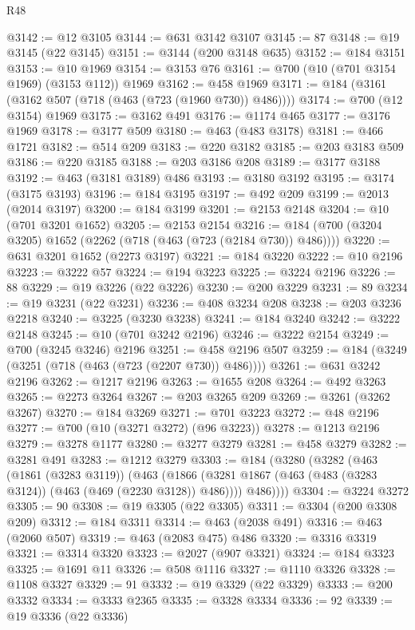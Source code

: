 \begin{lexlean}{R48}
\begin{coremodule}
@3142 := @12 @3105
@3144 := @631 @3142 @3107
@3145 := 87
@3148 := @19 @3145 (@22 @3145)
@3151 := @3144 (@200 @3148 @635)
@3152 := @184 @3151
@3153 := @10 @1969
@3154 := @3153 @76
@3161 := @700 (@10 (@701 @3154 @1969) (@3153 @112)) @1969
@3162 := @458 @1969
@3171 := @184 (@3161 (@3162 @507 (@718 (@463 (@723 (@1960 @730)) @486))))
@3174 := @700 (@12 @3154) @1969
@3175 := @3162 @491
@3176 := @1174 @465
@3177 := @3176 @1969
@3178 := @3177 @509
@3180 := @463 (@483 @3178)
@3181 := @466 @1721
@3182 := @514 @209
@3183 := @220 @3182
@3185 := @203 @3183 @509
@3186 := @220 @3185
@3188 := @203 @3186 @208
@3189 := @3177 @3188
@3192 := @463 (@3181 @3189) @486
@3193 := @3180 @3192
@3195 := @3174 (@3175 @3193)
@3196 := @184 @3195
@3197 := @492 @209
@3199 := @2013 (@2014 @3197)
@3200 := @184 @3199
@3201 := @2153 @2148
@3204 := @10 (@701 @3201 @1652)
@3205 := @2153 @2154
@3216 := @184 (@700 (@3204 @3205) @1652 (@2262 (@718 (@463 (@723 (@2184 @730)) @486))))
@3220 := @631 @3201 @1652 (@2273 @3197)
@3221 := @184 @3220
@3222 := @10 @2196
@3223 := @3222 @57
@3224 := @194 @3223
@3225 := @3224 @2196
@3226 := 88
@3229 := @19 @3226 (@22 @3226)
@3230 := @200 @3229
@3231 := 89
@3234 := @19 @3231 (@22 @3231)
@3236 := @408 @3234 @208
@3238 := @203 @3236 @2218
@3240 := @3225 (@3230 @3238)
@3241 := @184 @3240
@3242 := @3222 @2148
@3245 := @10 (@701 @3242 @2196)
@3246 := @3222 @2154
@3249 := @700 (@3245 @3246) @2196
@3251 := @458 @2196 @507
@3259 := @184 (@3249 (@3251 (@718 (@463 (@723 (@2207 @730)) @486))))
@3261 := @631 @3242 @2196
@3262 := @1217 @2196
@3263 := @1655 @208
@3264 := @492 @3263
@3265 := @2273 @3264
@3267 := @203 @3265 @209
@3269 := @3261 (@3262 @3267)
@3270 := @184 @3269
@3271 := @701 @3223
@3272 := @48 @2196
@3277 := @700 (@10 (@3271 @3272) (@96 @3223))
@3278 := @1213 @2196
@3279 := @3278 @1177
@3280 := @3277 @3279
@3281 := @458 @3279
@3282 := @3281 @491
@3283 := @1212 @3279
@3303 := @184
    (@3280
      (@3282
        (@463
          (@1861 (@3283 @3119))
          (@463
            (@1866 (@3281 @1867 (@463 (@483 (@3283 @3124)) (@463 (@469 (@2230 @3128)) @486))))
            @486))))
@3304 := @3224 @3272
@3305 := 90
@3308 := @19 @3305 (@22 @3305)
@3311 := @3304 (@200 @3308 @209)
@3312 := @184 @3311
@3314 := @463 (@2038 @491)
@3316 := @463 (@2060 @507)
@3319 := @463 (@2083 @475) @486
@3320 := @3316 @3319
@3321 := @3314 @3320
@3323 := @2027 (@907 @3321)
@3324 := @184 @3323
@3325 := @1691 @11
@3326 := @508 @1116
@3327 := @1110 @3326
@3328 := @1108 @3327
@3329 := 91
@3332 := @19 @3329 (@22 @3329)
@3333 := @200 @3332
@3334 := @3333 @2365
@3335 := @3328 @3334
@3336 := 92
@3339 := @19 @3336 (@22 @3336)

\end{coremodule}
\end{lexlean}
